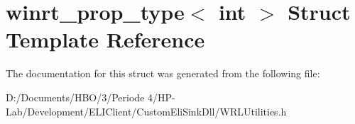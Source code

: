 \hypertarget{structwinrt__prop__type}{}\section{winrt\+\_\+prop\+\_\+type$<$ int $>$ Struct Template Reference}
\label{structwinrt__prop__type}


The documentation for this struct was generated from the following file\+:\begin{DoxyCompactItemize}
\item 
D\+:/\+Documents/\+H\+B\+O/3/\+Periode 4/\+H\+P-\/\+Lab/\+Development/\+E\+L\+I\+Client/\+Custom\+Eli\+Sink\+Dll/W\+R\+L\+Utilities.\+h\end{DoxyCompactItemize}
